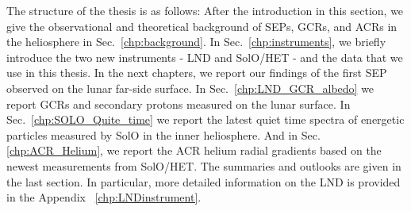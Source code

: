 The structure of the thesis is as follows: After the introduction in this section, we give the observational and theoretical background of \acp{SEP}, \acp{GCR}, and \acp{ACR} in the heliosphere in Sec.~\ref{chp:background}. In Sec.~\ref{chp:instruments}, we briefly introduce the two new instruments - \ac{LND} and \ac{SolO}/\ac{HET} - and the data that we use in this thesis. In the next chapters, we report our findings of the first \ac{SEP} observed on the lunar far-side surface. In Sec.~\ref{chp:LND_GCR_albedo} we report \acp{GCR} and secondary protons measured on the lunar surface. In Sec.~\ref{chp:SOLO_Quite_time} we report the latest quiet time spectra of energetic particles measured by \ac{SolO} in the inner heliosphere. And in Sec.\ref{chp:ACR_Helium}, we report the \ac{ACR} helium radial gradients based on the newest measurements from \ac{SolO}/\ac{HET}. The summaries and outlooks are given in the last section.
In particular, more detailed information on the \ac{LND} is provided in the Appendix ~\ref{chp:LNDinstrument}.

















